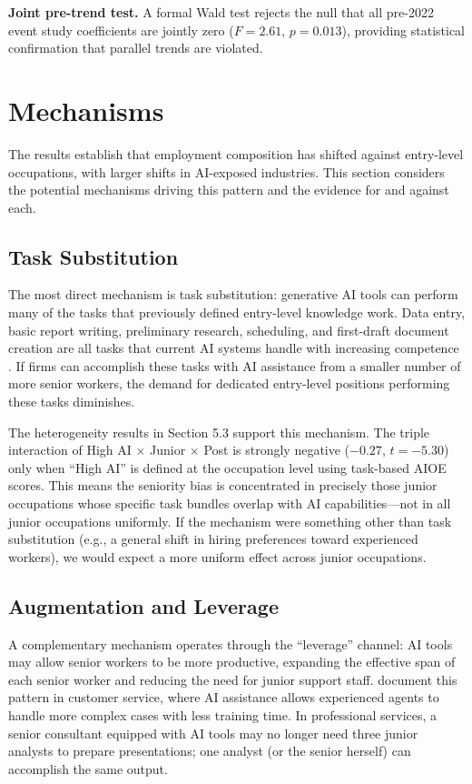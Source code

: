 \documentclass[12pt]{article}
\begin{document}
\textbf{Joint pre-trend test.} A formal Wald test rejects the null that all pre-2022 event study coefficients are jointly zero ($F = 2.61$, $p = 0.013$), providing statistical confirmation that parallel trends are violated.


\section{Mechanisms}

The results establish that employment composition has shifted against entry-level occupations, with larger shifts in AI-exposed industries. This section considers the potential mechanisms driving this pattern and the evidence for and against each.

\subsection{Task Substitution}

The most direct mechanism is task substitution: generative AI tools can perform many of the tasks that previously defined entry-level knowledge work. Data entry, basic report writing, preliminary research, scheduling, and first-draft document creation are all tasks that current AI systems handle with increasing competence \citep{noy2023, peng2023}. If firms can accomplish these tasks with AI assistance from a smaller number of more senior workers, the demand for dedicated entry-level positions performing these tasks diminishes.

The heterogeneity results in Section 5.3 support this mechanism. The triple interaction of High AI $\times$ Junior $\times$ Post is strongly negative ($-0.27$, $t = -5.30$) only when ``High AI'' is defined at the occupation level using task-based AIOE scores. This means the seniority bias is concentrated in precisely those junior occupations whose specific task bundles overlap with AI capabilities---not in all junior occupations uniformly. If the mechanism were something other than task substitution (e.g., a general shift in hiring preferences toward experienced workers), we would expect a more uniform effect across junior occupations.

\subsection{Augmentation and Leverage}

A complementary mechanism operates through the ``leverage'' channel: AI tools may allow senior workers to be more productive, expanding the effective span of each senior worker and reducing the need for junior support staff. \citet{brynjolfsson2023} document this pattern in customer service, where AI assistance allows experienced agents to handle more complex cases with less training time. In professional services, a senior consultant equipped with AI tools may no longer need three junior analysts to prepare presentations; one analyst (or the senior herself) can accomplish the same output.
\end{document}
